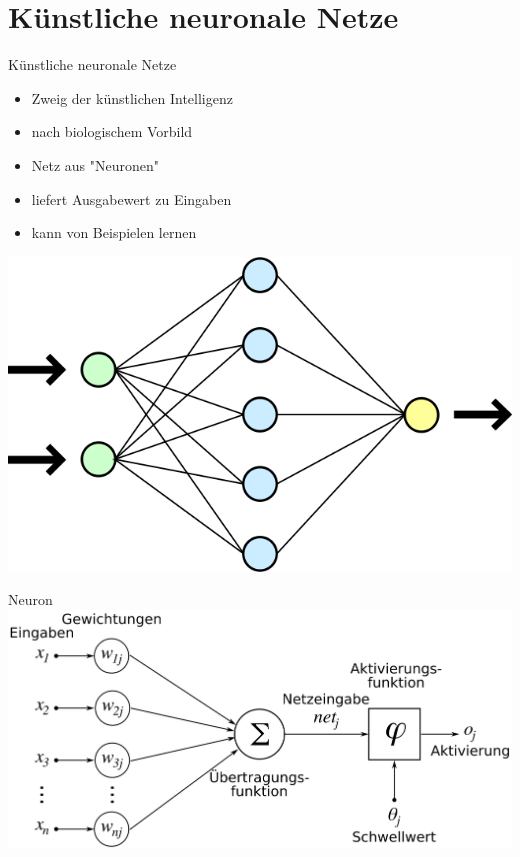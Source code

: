 \section{Künstliche neuronale Netze}

\begin{slide}{Künstliche neuronale Netze}
	\begin{itemize}
		\item Zweig der künstlichen Intelligenz
		\item nach biologischem Vorbild
		\item Netz aus "Neuronen"
		\item liefert Ausgabewert zu Eingaben
		\item kann von Beispielen lernen
	\end{itemize}
	\begin{center}
		\includegraphics[width=\textwidth,height=0.4\textheight,keepaspectratio]{content/Neural_network}
	\end{center}
\end{slide}

\begin{slide}{Neuron}
	\includegraphics[width=\textwidth,height=0.8\textheight,keepaspectratio]{content/ArtificialNeuronModel}
\end{slide}


